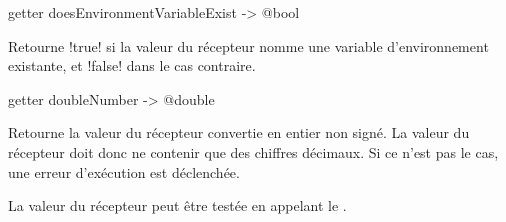 
\begin{galgasbox}
getter doesEnvironmentVariableExist -> @bool
\end{galgasbox}

Retourne \ggs!true! si la valeur du récepteur nomme une variable d'environnement existante, et \ggs!false! dans le cas contraire.









\begin{galgasbox}
getter doubleNumber -> @double
\end{galgasbox}

Retourne la valeur du récepteur convertie en entier non signé. La valeur du récepteur doit donc ne contenir que des chiffres décimaux. Si ce n'est pas le cas, une erreur d'exécution est déclenchée.

La valeur du récepteur peut être testée en appelant le .

